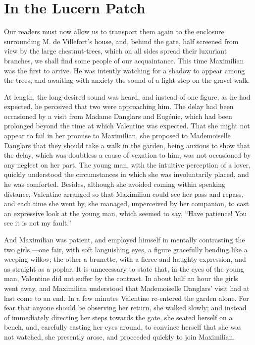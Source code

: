 \chapter{In the Lucern Patch}

Our readers must now allow us to transport them again to the enclosure
surrounding M. de Villefort’s house, and, behind the gate, half
screened from view by the large chestnut-trees, which on all sides
spread their luxuriant branches, we shall find some people of our
acquaintance. This time Maximilian was the first to arrive. He was
intently watching for a shadow to appear among the trees, and awaiting
with anxiety the sound of a light step on the gravel walk.

At length, the long-desired sound was heard, and instead of one figure,
as he had expected, he perceived that two were approaching him. The
delay had been occasioned by a visit from Madame Danglars and Eugénie,
which had been prolonged beyond the time at which Valentine was
expected. That she might not appear to fail in her promise to
Maximilian, she proposed to Mademoiselle Danglars that they should take
a walk in the garden, being anxious to show that the delay, which was
doubtless a cause of vexation to him, was not occasioned by any neglect
on her part. The young man, with the intuitive perception of a lover,
quickly understood the circumstances in which she was involuntarily
placed, and he was comforted. Besides, although she avoided coming
within speaking distance, Valentine arranged so that Maximilian could
see her pass and repass, and each time she went by, she managed,
unperceived by her companion, to cast an expressive look at the young
man, which seemed to say, “Have patience! You see it is not my fault.”

And Maximilian was patient, and employed himself in mentally
contrasting the two girls,—one fair, with soft languishing eyes, a
figure gracefully bending like a weeping willow; the other a brunette,
with a fierce and haughty expression, and as straight as a poplar. It
is unnecessary to state that, in the eyes of the young man, Valentine
did not suffer by the contrast. In about half an hour the girls went
away, and Maximilian understood that Mademoiselle Danglars’ visit had
at last come to an end. In a few minutes Valentine re-entered the
garden alone. For fear that anyone should be observing her return, she
walked slowly; and instead of immediately directing her steps towards
the gate, she seated herself on a bench, and, carefully casting her
eyes around, to convince herself that she was not watched, she
presently arose, and proceeded quickly to join Maximilian.

